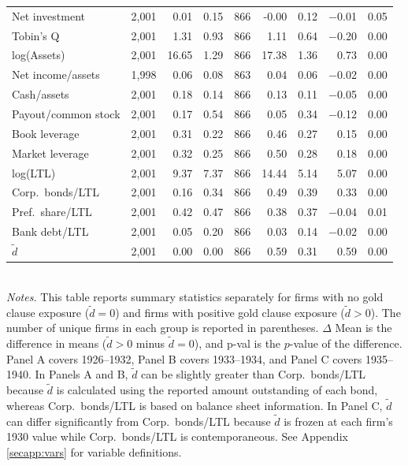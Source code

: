 \begin{table}[p]
\begin{threeparttable}
\begin{tabular}{l rrr rrr rr}
            Net investment & 2,001 & 0.01 & 0.15 & 866 & -0.00 & 0.12 & $-$0.01 & 0.05 \\
            Tobin's Q & 2,001 & 1.31 & 0.93 & 866 & 1.11 & 0.64 & $-$0.20 & 0.00 \\
            log(Assets) & 2,001 & 16.65 & 1.29 & 866 & 17.38 & 1.36 & 0.73 & 0.00 \\
            Net income/assets & 1,998 & 0.06 & 0.08 & 863 & 0.04 & 0.06 & $-$0.02 & 0.00 \\
            Cash/assets & 2,001 & 0.18 & 0.14 & 866 & 0.13 & 0.11 & $-$0.05 & 0.00 \\
            Payout/common stock & 2,001 & 0.17 & 0.54 & 866 & 0.05 & 0.34 & $-$0.12 & 0.00 \\
            Book leverage & 2,001 & 0.31 & 0.22 & 866 & 0.46 & 0.27 & 0.15 & 0.00 \\
            Market leverage & 2,001 & 0.32 & 0.25 & 866 & 0.50 & 0.28 & 0.18 & 0.00 \\
            log(LTL) & 2,001 & 9.37 & 7.37 & 866 & 14.44 & 5.14 & 5.07 & 0.00 \\
            Corp.\ bonds/LTL & 2,001 & 0.16 & 0.34 & 866 & 0.49 & 0.39 & 0.33 & 0.00 \\
            Pref.\ share/LTL & 2,001 & 0.42 & 0.47 & 866 & 0.38 & 0.37 & $-$0.04 & 0.01 \\
            Bank debt/LTL & 2,001 & 0.05 & 0.20 & 866 & 0.03 & 0.14 & $-$0.02 & 0.00 \\
            \ensuremath{\tilde{d}} & 2,001 & 0.00 & 0.00 & 866 & 0.59 & 0.31 & 0.59 & 0.00 \\
            \bottomrule
        \end{tabular}
    \end{threeparttable}\\
    
    \vspace*{3mm} \justifying \noindent
    \scriptsize{\textit{Notes.} This table reports summary statistics separately for firms with no gold clause exposure ($\tilde{d} = 0$) and firms with positive gold clause exposure ($\tilde{d} > 0$). The number of unique firms in each group is reported in parentheses. $\Delta$ Mean is the difference in means ($\tilde{d} > 0$ minus $\tilde{d} = 0$), and p-val is the $p$-value of the difference. Panel A covers 1926--1932, Panel B covers 1933--1934, and Panel C covers 1935--1940. In Panels A and B, $\tilde{d}$ can be slightly greater than Corp.\ bonds/LTL because $\tilde{d}$ is calculated using the reported amount outstanding of each bond, whereas Corp.\ bonds/LTL is based on balance sheet information. In Panel C, $\tilde{d}$ can differ significantly from Corp.\ bonds/LTL because $\tilde{d}$ is frozen at each firm's 1930 value while Corp.\ bonds/LTL is contemporaneous. See Appendix \ref{secapp:vars} for variable definitions.}
\end{table}
